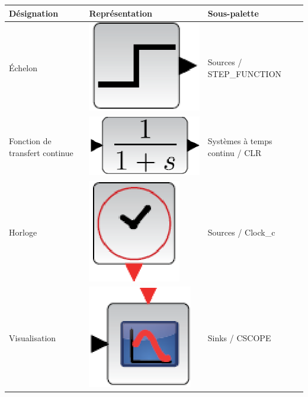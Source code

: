 \begin{table}[!h]
    \centering
    \begin{tabular}{@{}P{4cm}P{6cm}P{4cm}@{}}
    \toprule
    Désignation   & Représentation & Sous-palette \\
    \midrule
    \'Echelon     & 
    \begin{minipage}{6cm}
    \centering
    \includegraphics[width=0.25\linewidth]{fig/scilab05.eps}
    \end{minipage} &
    Sources / STEP\_FUNCTION \\
    \midrule
    Fonction de transfert continue     & 
    \begin{minipage}{6cm}
    \centering
    \includegraphics[width=0.25\linewidth]{fig/scilab06.eps}
    \end{minipage} & 
    Systèmes à temps continu / CLR \\
    \midrule
    Horloge       & 
    \begin{minipage}{6cm}
    \centering
    \includegraphics[width=0.2\linewidth]{fig/scilab07.eps}
    \end{minipage} & 
    Sources / Clock\_c \\
    \midrule
    Visualisation & 
    \begin{minipage}{6cm}
    \centering
    \includegraphics[width=0.25\linewidth]{fig/scilab08.eps}
    \end{minipage} & 
    Sinks / CSCOPE \\
    \bottomrule
\end{tabular}
\end{table}

